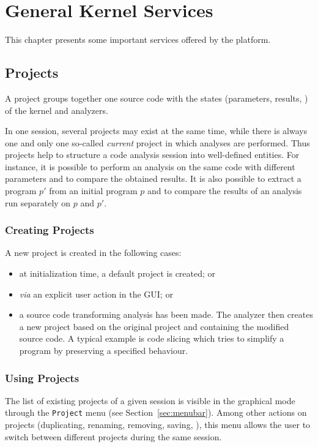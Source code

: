 \chapter{General Kernel Services}\label{user-services}

This chapter presents some important services offered by the \FramaC platform.

\section{Projects}\label{sec:project}

A \FramaC project groups together one source code with the states (parameters,
results, \etc) of the \FramaC kernel and analyzers. 

In one \FramaC session, several projects may exist at the same time, while
there is always one and only one so-called \emph{current} project in which
analyses are performed.  Thus projects help to structure a code analysis
session into well-defined entities. For instance, it is possible to perform an
analysis on the same code with different parameters and to compare the obtained
results. It is also possible to extract a program $p'$ from an initial program
$p$ and to compare the results of an analysis run separately on $p$ and $p'$.

\subsection{Creating Projects}

A new project is created in the following cases:
\begin{itemize}
\item at initialization time, a default project is created; or
\item \emph{via} an explicit user action in the GUI; or
\item a source code transforming analysis has been made. The analyzer then
  creates a new project based on the original project and containing the
  modified source code. A typical example is code slicing which tries to
  simplify a program by preserving a specified behaviour.
\end{itemize}

\subsection{Using Projects}

The list of existing projects of a given session is visible in the graphical
mode through the \texttt{Project} menu (see Section~\ref{sec:menubar}). Among
other actions on projects (duplicating, renaming, removing, saving, \etc), this
menu allows the user to switch between different projects during the same
session.

